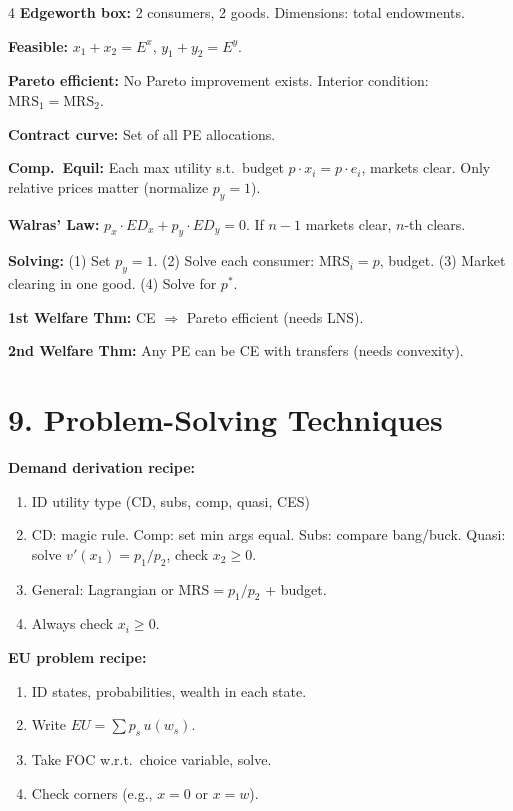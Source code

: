 \documentclass[8pt,landscape]{extarticle}
\newcommand{\HI}[1]{\colorbox{yellow!30}{#1}}
\begin{document}
\begin{multicols}{4}
\textbf{Edgeworth box:} 2 consumers, 2 goods. Dimensions: total endowments.

\textbf{Feasible:} $x_1+x_2=E^x$, $y_1+y_2=E^y$.

\textbf{Pareto efficient:} No Pareto improvement exists. Interior condition: \HI{$\text{MRS}_1 = \text{MRS}_2$}.

\textbf{Contract curve:} Set of all PE allocations.

\textbf{Comp.\ Equil:} Each max utility s.t.\ budget $p\cdot x_i = p\cdot e_i$, markets clear. Only relative prices matter (normalize $p_y=1$).

\textbf{Walras' Law:} $p_x\cdot ED_x + p_y\cdot ED_y = 0$. If $n-1$ markets clear, $n$-th clears.

\textbf{Solving:} (1) Set $p_y=1$. (2) Solve each consumer: MRS$_i = p$, budget. (3) Market clearing in one good. (4) Solve for $p^*$.

\textbf{1st Welfare Thm:} CE $\Rightarrow$ Pareto efficient (needs LNS).

\textbf{2nd Welfare Thm:} Any PE can be CE with transfers (needs convexity).

\section{9. Problem-Solving Techniques}

\HI{\textbf{Demand derivation recipe:}}
\begin{enumerate}[leftmargin=10pt]
\item ID utility type (CD, subs, comp, quasi, CES)
\item CD: magic rule. Comp: set min args equal. Subs: compare bang/buck. Quasi: solve $v'(x_1)=p_1/p_2$, check $x_2\geq 0$.
\item General: Lagrangian or MRS$=p_1/p_2$ + budget.
\item Always check $x_i \geq 0$.
\end{enumerate}

\HI{\textbf{EU problem recipe:}}
\begin{enumerate}[leftmargin=10pt]
\item ID states, probabilities, wealth in each state.
\item Write $EU = \sum p_s\, u(w_s)$.
\item Take FOC w.r.t.\ choice variable, solve.
\item Check corners (e.g., $x=0$ or $x=w$).
\end{enumerate}


\end{multicols}
\end{document}
